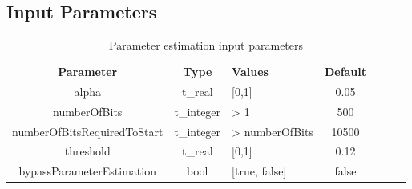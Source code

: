 \subsection*{Input Parameters}


\begin{table}[h]
	\centering
	\begin{tabular}{|c|c|p{60mm}|c|ccp{60mm}}
		\cline{1-4}
		\textbf{Parameter} & \textbf{Type} & \textbf{Values} &   \textbf{Default}& \\ \cline{1-4}
		alpha & t\_real & [0,1] & 0.05 \\ \cline{1-4}
		numberOfBits & t\_integer & > 1 & 500 \\ \cline{1-4}
		numberOfBitsRequiredToStart & t\_integer &  > numberOfBits & 10500 \\ \cline{1-4}
		threshold & t\_real & [0,1] & 0.12 \\ \cline{1-4}
		bypassParameterEstimation & bool & [true, false] & false \\ \cline{1-4}
	\end{tabular}
	\caption{Parameter estimation input parameters}
	\label{table:par_est_in_par}
\end{table}

